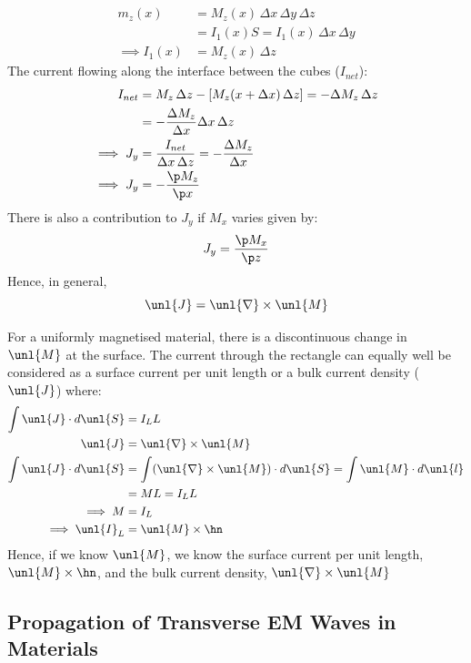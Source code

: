 \documentclass[a4paper, 11pt, normalem]{report}
\renewcommand\del{\unl{\nabla}}
\newcommand\J{\unl{J}}
\newcommand\M{\unl{M}}
\begin{document}
\chapter{}
\begin{align}
    m_z(x) &= M_z(x)\,\Delta x\,\Delta y\,\Delta z \\
    &= I_1(x)S = I_1(x)\,\Delta x\,\Delta y \\
    \implies I_1(x) &= M_z(x)\,\Delta z
\end{align}
The current flowing along the interface between the cubes ($I_{net}$):
\begin{align}
    I_{net} &= M_z\,\Delta z - [M_z(x + \Delta x)\,\Delta z] = -\Delta M_z\,\Delta z \\
    &= -\frac{\Delta M_z}{\Delta x} \Delta x\, \Delta z \\
    \implies J_y &= \frac{I_{net}}{\Delta x\,\Delta z} = - \frac{\Delta M_z}{\Delta x} \\
    \implies J_y &= -\frac{\p M_z}{\p x}
\end{align}
There is also a contribution to $J_y$ if $M_x$ varies given by:
\begin{equation}
    J_y = \frac{\p M_x}{\p z}
\end{equation}
Hence, in general,
\begin{equation}
    \J = \del \times \unl{M}
\end{equation}

For a uniformly magnetised material, there is a discontinuous change in $\unl{M}$ at the surface.
The current through the rectangle can equally well be considered as a surface current per unit length or a bulk current density ($\J$) where:
\begin{align}
    \int \J\cdot d\unl{S} &= I_LL \\
    \J &= \del \times \unl{M} \\
    \int \J\cdot d\unl{S} &= \int (\del\times\unl{M})\cdot d\unl{S} = \int \unl{M}\cdot d\unl{l} \\
    &= ML = I_LL \\
    \implies M &= I_L \\
    \implies \unl{I}_L &= \unl{M}\times\hn
\end{align}
Hence, if we know $\unl{M}$, we know the surface current per unit length, $\M \times \hn$, and the bulk current density, $\del\times\M$

\section{Propagation of Transverse EM Waves in Materials}
\end{document}
